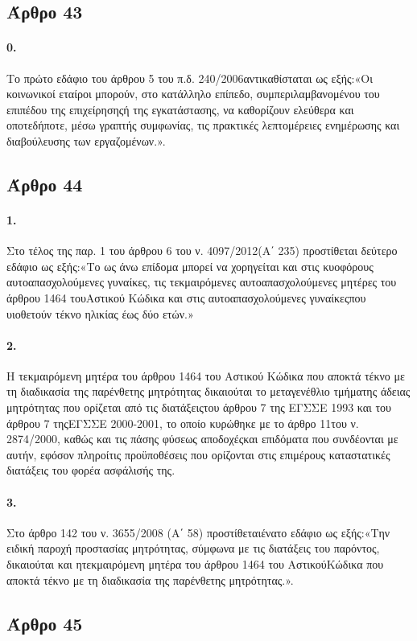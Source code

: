 \documentclass[a4paper,oneside, 10pt]{book}
\begin{document}
\subsection*{ Άρθρο 43 }
\paragraph { 0. } Το πρώτο εδάφιο του άρθρου 5 του π.δ. 240/2006αντικαθίσταται ως εξής:«Οι κοινωνικοί εταίροι μπορούν, στο κατάλληλο επίπεδο, συμπεριλαμβανομένου του επιπέδου της επιχείρησηςή της εγκατάστασης, να καθορίζουν ελεύθερα και οποτεδήποτε, μέσω γραπτής συμφωνίας, τις πρακτικές λεπτομέρειες ενημέρωσης και διαβούλευσης των εργαζομένων.».
\subsection*{ Άρθρο 44 }
\paragraph { 1. } Στο τέλος της παρ. 1 του άρθρου 6 του ν. 4097/2012(Α΄ 235) προστίθεται δεύτερο εδάφιο ως εξής:«Το ως άνω επίδομα μπορεί να χορηγείται και στις κυοφόρους αυτοαπασχολούμενες γυναίκες, τις τεκμαιρόμενες αυτοαπασχολούμενες μητέρες του άρθρου 1464 τουΑστικού Κώδικα και στις αυτοαπασχολούμενες γυναίκεςπου υιοθετούν τέκνο ηλικίας έως δύο ετών.»
\paragraph { 2. } Η τεκμαιρόμενη μητέρα του άρθρου 1464 του Αστικού Κώδικα που αποκτά τέκνο με τη διαδικασία της παρένθετης μητρότητας δικαιούται το μεταγενέθλιο τμήματης άδειας μητρότητας που ορίζεται από τις διατάξειςτου άρθρου 7 της ΕΓΣΣΕ 1993 και του άρθρου 7 τηςΕΓΣΣΕ 2000-2001, το οποίο κυρώθηκε με το άρθρο 11του ν. 2874/2000, καθώς και τις πάσης φύσεως αποδοχέςκαι επιδόματα που συνδέονται με αυτήν, εφόσον πληροίτις προϋποθέσεις που ορίζονται στις επιμέρους καταστατικές διατάξεις του φορέα ασφάλισής της.
\paragraph { 3. } Στο άρθρο 142 του ν. 3655/2008 (Α΄ 58) προστίθεταιένατο εδάφιο ως εξής:«Την ειδική παροχή προστασίας μητρότητας, σύμφωνα με τις διατάξεις του παρόντος, δικαιούται και ητεκμαιρόμενη μητέρα του άρθρου 1464 του ΑστικούΚώδικα που αποκτά τέκνο με τη διαδικασία της παρένθετης μητρότητας.».
\subsection*{ Άρθρο 45 }
\end{document}
